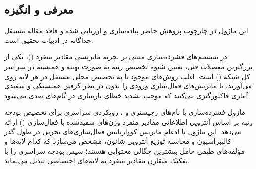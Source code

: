 \subsection{معرفی و انگیزه}
این ماژول در چارچوب پژوهش حاضر پیاده‌سازی و ارزیابی شده و فاقد مقاله مستقل جداگانه در ادبیات تحقیق است.

در سیستم‌های فشرده‌سازی مبتنی بر تجزیه ماتریسی مقادیر منفرد ()، یکی از بزرگترین معضلات فنی، تعیین شیوه تخصیص رتبه به صورت بهینه و همبسته در سراسر کل شبکه () است. اغلب روش‌های موجود یا به تخصیص محلی مستقل در هر لایه روی می‌آورند، یا ماتریس‌های فعال‌سازی ورودی را بدون در نظر گرفتن همبستگی و سفیدی آماری فاکتورگیری می‌کنند که موجب تشدید خطای بازسازی در گام‌های بعدی می‌شود.

ماژول فشرده‌سازی  با نام‌های رجیستری  و ، رویکردی سراسری برای تخصیص بودجه رتبه بر اساس آنتروپی اطلاعاتی مقادیر منفرد وزن‌های سفیدشده با فعال‌سازی () ارائه می‌دهد. این ماژول با ادغام ماتریس کوواریانس فعال‌سازی‌های تجربی در طول گذر کالیبراسیون و محاسبه توزیع آنتروپی شانون، مشخص می‌سازد که کدام لایه‌ها و مؤلفه‌های طیفی حامل بیشترین چگالی محتوایی هستند؛ سپس بودجه سراسری را با تفکیک متقارن مقادیر منفرد به لایه‌های اختصاصی  تبدیل می‌نماید.

